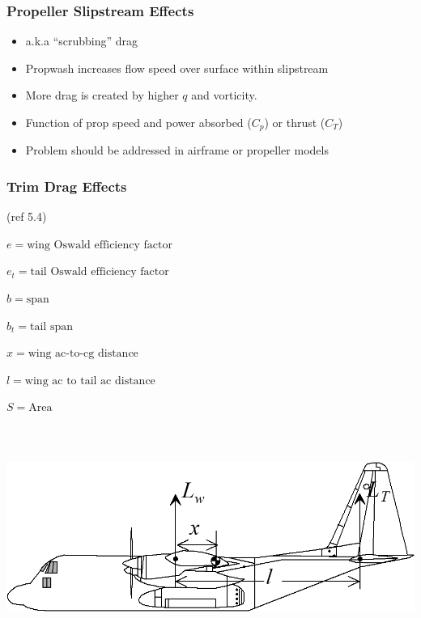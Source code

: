 \documentclass[
]{book}
\providecommand{\tightlist}{%
  \setlength{\itemsep}{0pt}\setlength{\parskip}{0pt}}
\begin{document}
\hypertarget{propeller-slipstream-effects}{%
\subsubsection*{Propeller Slipstream Effects}\label{propeller-slipstream-effects}}

\begin{itemize}
\tightlist
\item
  a.k.a ``scrubbing'' drag
\item
  Propwash increases flow speed over surface within slipstream
\item
  More drag is created by higher \(q\) and vorticity.
\item
  Function of prop speed and power absorbed (\(C_p\)) or thrust (\(C_T\))
\item
  Problem should be addressed in airframe or propeller models
\end{itemize}

\hypertarget{trim-drag-effects}{%
\subsubsection*{Trim Drag Effects}\label{trim-drag-effects}}

(ref 5.4)

\(e = \text{wing Oswald efficiency factor}\)

\(e_t = \text{tail Oswald efficiency factor}\)

\(b = \text{span}\)

\(b_t = \text{tail span}\)

\(x = \text{wing ac-to-cg distance}\)

\(l = \text{wing ac to tail ac distance}\)

\(S = \text{Area}\)

\includegraphics[width=7.75in,height=2.844in]{media/05/image86.png}
\end{document}
